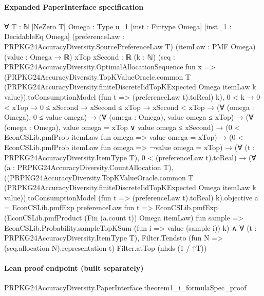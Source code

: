 \documentclass[10pt]{article}
\begin{document}
\paragraph{Expanded PaperInterface specification}
\begin{ReviewVerbatim}
∀ {T : ℕ} [NeZero T] {Omega : Type u_1} [inst : Fintype Omega] [inst_1 : DecidableEq Omega]
  (preferenceLaw : PRPKG24AccuracyDiversity.SourcePreferenceLaw T) (itemLaw : PMF Omega) (value : Omega → ℝ)
  {xTop xSecond : ℝ} (k : ℕ)
  (seq :
    PRPKG24AccuracyDiversity.OptimalAllocationSequence fun x =>
      (PRPKG24AccuracyDiversity.TopKValueOracle.common T
            (PRPKG24AccuracyDiversity.finiteDiscreteIidTopKExpected Omega itemLaw k value)).toConsumptionModel
        (fun t => (preferenceLaw t).toReal) k),
  0 < k →
    0 < xTop →
      0 ≤ xSecond →
        xSecond ≤ xTop →
          xSecond < xTop →
            (∀ (omega : Omega), 0 ≤ value omega) →
              (∀ (omega : Omega), value omega ≤ xTop) →
                (∀ (omega : Omega), value omega = xTop ∨ value omega ≤ xSecond) →
                  (0 < EconCSLib.pmfProb itemLaw fun omega => value omega = xTop) →
                    (0 < EconCSLib.pmfProb itemLaw fun omega => ¬value omega = xTop) →
                      (∀ (t : PRPKG24AccuracyDiversity.ItemType T), 0 < (preferenceLaw t).toReal) →
                        (∀ (a : PRPKG24AccuracyDiversity.CountAllocation T),
                            ((PRPKG24AccuracyDiversity.TopKValueOracle.common T
                                        (PRPKG24AccuracyDiversity.finiteDiscreteIidTopKExpected Omega itemLaw k
                                          value)).toConsumptionModel
                                    (fun t => (preferenceLaw t).toReal) k).objective
                                a =
                              EconCSLib.pmfExp preferenceLaw fun t =>
                                EconCSLib.pmfExp (EconCSLib.pmfProduct (Fin (a.count t)) Omega itemLaw) fun sample =>
                                  EconCSLib.Probability.sampleTopKSum (fun i => value (sample i)) k) ∧
                          ∀ (t : PRPKG24AccuracyDiversity.ItemType T),
                            Filter.Tendsto (fun N => (seq.allocation N).representation t) Filter.atTop (nhds (1 / ↑T))
\end{ReviewVerbatim}

\paragraph{Lean proof endpoint (built separately)}\begin{ReviewVerbatim}
PRPKG24AccuracyDiversity.PaperInterface.theorem1_i_formulaSpec_proof
\end{ReviewVerbatim}
\end{document}
